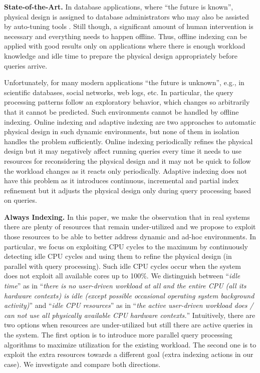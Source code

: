 \textbf{State-of-the-Art.} In database applications, where ``the future is known'', physical design is assigned to database administrators
who may also be assisted by auto-tuning tools 
\cite{DBLP:conf/vldb/AgrawalCKMNS04,DBLP:conf/vldb/DagevilleDDYZZ04,DBLP:conf/vldb/ZilioRLLSGF04}.
Still though, a significant amount of human intervention is necessary and everything needs to happen offline.
Thus, offline indexing can be applied with good results only on applications where there is enough workload 
knowledge and idle time to prepare the physical design appropriately before queries arrive.

Unfortunately, for many modern applications ``the future is unknown'', e.g., in scientific databases, social networks, web logs, etc.
In particular, the query processing patterns follow an exploratory behavior, which changes so arbitrarily that it cannot be predicted.
Such environments cannot be handled by offline indexing.
Online indexing \cite{DBLP:conf/icde/BrunoC07,DBLP:conf/sigmod/SchnaitterAMP06} 
and adaptive indexing \cite{DBLP:conf/cidr/IdreosKM07} 
are two approaches to automatic physical design in such dynamic environments, but none of them in isolation handles the problem sufficiently.
Online indexing periodically refines the physical design but it may negatively affect running queries every time
it needs to use resources for reconsidering the physical design and it may not be quick to follow the workload changes as it reacts only periodically. 
Adaptive indexing does not have this problem as it introduces continuous, incremental and partial index refinement 
but it adjusts the physical design only during query processing based on queries.

\textbf{Always Indexing.}
In this paper, we make the observation that in real systems there are plenty of resources that remain under-utilized and 
we propose to exploit those resources to be able to better address dynamic and  ad-hoc environments. 
In particular, we focus on exploiting CPU cycles to the maximum by continuously detecting idle CPU cycles
and using them to refine the physical design (in parallel with query processing).
Such idle CPU cycles occur when the system  does not exploit all available cores up to 100\%.
We distinguish between ``\emph{idle time}'' as in
``\emph{there is no user-driven workload at all and the entire CPU (all its hardware contexts) is idle (except possible occasional operating system background activity)}''
and ``\emph{idle CPU resources}'' as in
``\emph{the active user-driven workload does / can not use all physically available CPU hardware contexts.}'' 
Intuitively, there are two options when resources are under-utilized but still there are active queries in the system.
The first option is to introduce more parallel query processing algorithms to maximize utilization for the existing workload. The second one is to exploit the extra resources towards a different goal (extra indexing actions in our case). We investigate and compare both directions.


